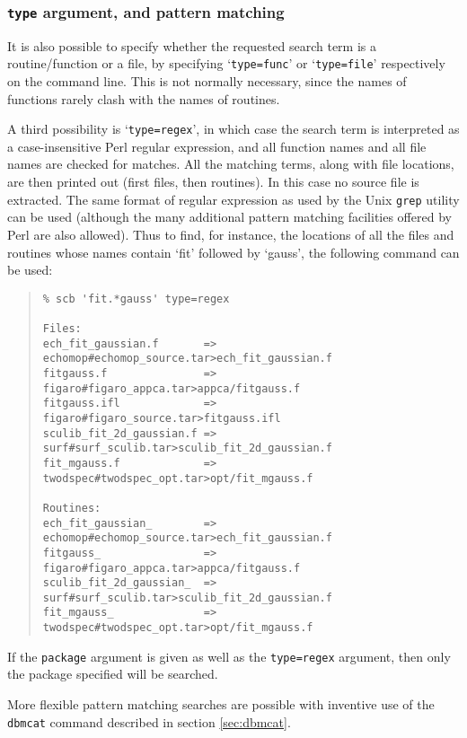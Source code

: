 \documentclass[twoside,11pt]{article}
\newcommand{\xlabel}[1]{}
\renewcommand{\_}{\texttt{\symbol{95}}}
\begin{document}
\subsubsection{\xlabel{sec:extract-type}\label{sec:extract-type}{\tt type} argument, and pattern matching}

It is also possible to specify whether the requested search
term is a routine/function or a file, by specifying `{\tt type=func}'
or `{\tt type=file}' respectively on the command line.  This is not
normally necessary, since the names of functions rarely clash with
the names of routines.

A third possibility is `{\tt type=regex}', in which case the 
search term is interpreted as a case-insensitive 
Perl regular expression, and
all function names and all file names are checked for matches.
All the matching terms, along with file locations, are then printed out
(first files, then routines).
In this case no source file is extracted.
The same format of regular expression as used by the Unix {\tt grep}
utility can be used 
(although the many additional pattern matching facilities
offered by Perl are also allowed).
Thus to find, for instance, the locations of 
all the files and routines whose names contain `fit' followed
by `gauss', the following command can be used:
\begin{quote}
\begin{verbatim}
% scb 'fit.*gauss' type=regex

Files:
ech_fit_gaussian.f       => echomop#echomop_source.tar>ech_fit_gaussian.f
fitgauss.f               => figaro#figaro_appca.tar>appca/fitgauss.f
fitgauss.ifl             => figaro#figaro_source.tar>fitgauss.ifl
sculib_fit_2d_gaussian.f => surf#surf_sculib.tar>sculib_fit_2d_gaussian.f
fit_mgauss.f             => twodspec#twodspec_opt.tar>opt/fit_mgauss.f

Routines:
ech_fit_gaussian_        => echomop#echomop_source.tar>ech_fit_gaussian.f
fitgauss_                => figaro#figaro_appca.tar>appca/fitgauss.f
sculib_fit_2d_gaussian_  => surf#surf_sculib.tar>sculib_fit_2d_gaussian.f
fit_mgauss_              => twodspec#twodspec_opt.tar>opt/fit_mgauss.f
\end{verbatim}
\end{quote}
If the {\tt package} argument is given as well as the {\tt type=regex}
argument, then only the package specified will be searched.

More flexible pattern matching searches are possible 
with inventive use of the {\tt dbmcat} command described
in section \ref{sec:dbmcat}.
\end{document}

